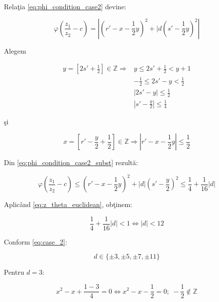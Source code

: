 \documentclass[12pt]{article}
\begin{document}
Relaţia \eqref{eq:phi_condition_case2} devine:

\begin{equation} \label{eq:phi_condition_case2_subst}
    \varphi \left(\frac{z_1}{z_2} - c\right) =
    \left| \left(r' - x - \frac{1}{2}y \right) ^2  + |d \left(s' - \frac{1}{2}y\right)^2  \right|
\end{equation}

Alegem

\begin{equation*}
\begin{split}
    y = \left[ 2s' + \frac{1}{2} \right] \in \mathbb{Z} \Rightarrow & 
    y \leq 2s' + \frac{1}{2} < y + 1 \\
    & -\frac{1}{2} \leq 2s'- y < \frac{1}{2} \\ 
    & \left| 2s' - y \right| \leq \frac{1}{2} \\
    & \boxed{\left| s' - \frac{y}{2} \right| \leq \frac{1}{4}}
\end{split}
\end{equation*}

şi

\begin{equation*}
    x = \left[ r' - \frac{y}{2} + \frac{1}{2} \right] \in \mathbb{Z} \Rightarrow 
    \boxed{|r' - x - \frac{1}{2}y| \leq \frac{1}{2}}
\end{equation*}


Din \eqref{eq:phi_condition_case2_subst} rezultă:

\begin{equation*}
    \varphi \left(\frac{z_1}{z_2} - c\right) \leq
    \left( r'- x - \frac{1}{2}y \right)^2 + |d|\left(s' - \frac{y}{2}\right)^2 \leq \frac{1}{4} + \frac{1}{16}|d|
\end{equation*}

Aplicând \eqref{eq:z_theta_euclidean}, obţinem:

\begin{equation*}
    \frac{1}{4} + \frac{1}{16}|d| < 1 \Leftrightarrow |d| < 12
\end{equation*}

Conform \eqref{eq:case_2}:

\begin{equation*}
    d \in \{\pm 3, \pm 5, \pm 7, \pm 11\}
\end{equation*}

Pentru $d = 3$:

\begin{equation*}
    x^2 - x + \frac{1 - 3}{4} = 0
    \Leftrightarrow x^2 - x - \frac{1}{2} = 0; \; -\frac{1}{2} \notin \mathbb{Z}
\end{equation*}
\end{document}
